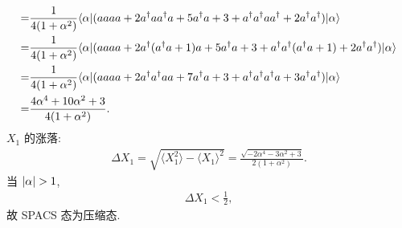 \documentclass{assignment}
\begin{document}
\begin{pf}
\begin{align}
        \notag=&\frac{1}{4(1+\alpha^2)}\langle\alpha\rvert(aaaa+2a^{\dagger}aa^{\dagger}a+5a^{\dagger}a+3+a^{\dagger}a^{\dagger}aa^{\dagger}+2a^{\dagger}a^{\dagger})\lvert\alpha\rangle\\
        \notag=&\frac{1}{4(1+\alpha^2)}\langle\alpha\rvert(aaaa+2a^{\dagger}(a^{\dagger}a+1)a+5a^{\dagger}a+3+a^{\dagger}a^{\dagger}(a^{\dagger}a+1)+2a^{\dagger}a^{\dagger})\lvert\alpha\rangle\\
        \notag=&\frac{1}{4(1+\alpha^2)}\langle\alpha\rvert(aaaa+2a^{\dagger}a^{\dagger}aa+7a^{\dagger}a+3+a^{\dagger}a^{\dagger}a^{\dagger}a+3a^{\dagger}a^{\dagger})\lvert\alpha\rangle\\
        =&\frac{4\alpha^4+10\alpha^2+3}{4(1+\alpha^2)}.
    \end{align}
    $X_1$ 的涨落:
    \begin{align}
        \Delta X_1=\sqrt{\langle X_1^2\rangle-\langle X_1\rangle^2}=\frac{\sqrt{-2\alpha^4-3\alpha^2+3}}{2(1+\alpha^2)}.
    \end{align}
    当 $\left\lvert\alpha\right\rvert>1$,
    \begin{align}
        \Delta X_1<\frac{1}{2},
    \end{align}
    故 SPACS 态为压缩态.
\end{pf}
\end{document}

